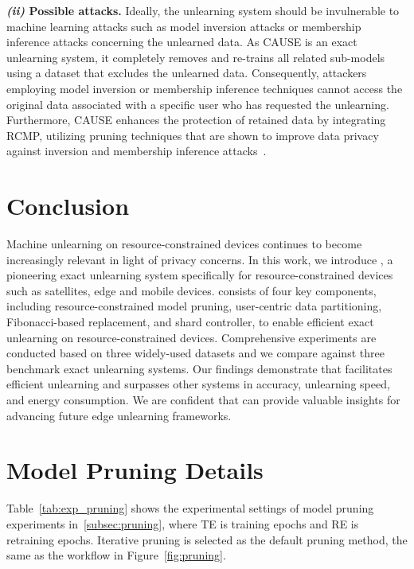 \documentclass[conference,compsoc]{IEEEtran}
\begin{document}
\noindent \textbf{\textit{(ii)} Possible attacks.} Ideally, the unlearning system should be invulnerable to machine learning attacks such as model inversion attacks or membership inference attacks concerning the unlearned data. As CAUSE is an exact unlearning system, it completely removes and re-trains all related sub-models using a dataset that excludes the unlearned data. Consequently, attackers employing model inversion or membership inference techniques cannot access the original data associated with a specific user who has requested the unlearning. Furthermore, CAUSE enhances the protection of retained data by integrating RCMP, utilizing pruning techniques that are shown to improve data privacy against inversion and membership inference attacks~\cite{chen2018shallowing, yuan2022membership}.

\section{Conclusion}
\label{sec:conclusion}

Machine unlearning on resource-constrained devices continues to become increasingly relevant in light of privacy concerns. In this work, we introduce \tool, a pioneering exact unlearning system specifically for resource-constrained devices such as satellites, edge and mobile devices. \tool consists of four key components, including resource-constrained model pruning, user-centric data partitioning, Fibonacci-based replacement, and shard controller, to enable efficient exact unlearning on resource-constrained devices. Comprehensive experiments are conducted based on three widely-used datasets and we compare \tool against three benchmark exact unlearning systems. Our findings demonstrate that \tool facilitates efficient unlearning and surpasses other systems in accuracy, unlearning speed, and energy consumption. We are confident that \tool can provide valuable insights for advancing future edge unlearning frameworks.




\appendices

\section{Model Pruning Details}
\label{apx:pruning_settings}


Table~\ref{tab:exp_pruning} shows the experimental settings of model pruning experiments in~\ref{subsec:pruning}, where TE is training epochs and RE is retraining epochs. Iterative pruning is selected as the default pruning method, the same as the workflow in Figure~\ref{fig:pruning}. 
\end{document}
